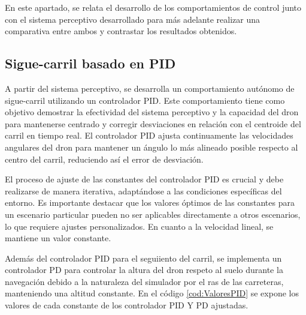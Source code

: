   En este apartado, se relata el desarrollo de los comportamientos de control junto con el sistema perceptivo desarrollado para más adelante realizar 
  una comparativa entre ambos y contrastar los resultados obtenidos.

\subsection{Sigue-carril basado en PID}
\label{sec:Control}

A partir del sistema perceptivo, se desarrolla un comportamiento autónomo de sigue-carril utilizando un controlador PID. Este comportamiento tiene como objetivo
demostrar la efectividad del sistema perceptivo y la capacidad del dron para mantenerse centrado y corregir desviaciones en relación
con el centroide del carril en tiempo real. El controlador PID ajusta continuamente las velocidades angulares del dron para mantener un ángulo lo más alineado posible respecto al 
centro del carril, reduciendo así el error de desviación.

El proceso de ajuste de las constantes del controlador PID es crucial y debe realizarse de manera iterativa, adaptándose a las condiciones específicas del entorno. Es importante
destacar que los valores óptimos de las constantes para un escenario particular pueden no ser aplicables directamente a otros escenarios, lo que requiere ajustes personalizados. 
En cuanto a la velocidad lineal, se mantiene un valor constante.\newline

Además del controlador PID para el seguiiento del carril, se implementa un controlador PD para controlar la altura del dron respeto al suelo durante la navegación debido a la naturaleza
del simulador por el ras de las carreteras, manteniendo una altitud constante. En el código \ref{cod:ValoresPID} se expone los valores de cada constante de los controlador PID Y PD ajustadas. \newline


